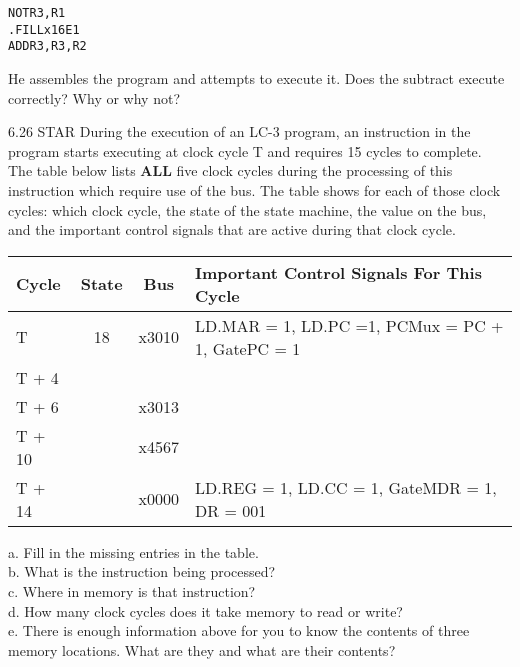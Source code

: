 \documentclass{patt}
\begin{document}
\begin{exercises}
\begin{center}
\begin{minipage}[t]{0.5\linewidth}
\begin{flushleft}
{
\begin{alltt}
NOT   R3,R1
.FILL x16E1
ADD   R3,R3,R2
\end{alltt}
}
\end{flushleft}
\end{minipage}
\end{center}

\noindent 
He assembles the program and attempts to execute it.
Does the subtract execute correctly?  Why or why not? \\

\item[6.26]STAR During the execution of an LC-3 program, an instruction in the program
starts executing at clock cycle T and requires 15 cycles to complete. \\

\noindent
The table below lists \textbf{ALL} five clock cycles during the
processing of this instruction which require use of the bus.  The table
shows for each of those clock cycles: which clock cycle, the state of the
state machine, the value on the bus, and the important control signals that
are active during that clock cycle. \\


\begin{center}
\begin{tabular}{|l|c|c|l|}
\hline
Cycle & State & Bus & Important Control Signals For This Cycle \\ \hline \hline
T &18 & x3010 & LD.MAR = 1, LD.PC =1, PCMux = PC + 1, GatePC = 1 { }{ }{ }{ }{ }{ }{ }{ }{ }{ }{ }{ }{ }{ }{ }{ }{ }{ }{ }{ }{ }{ }{ }{ }{ }\\ \hline
T + 4 &  &  &  \\ \hline
T + 6 &    & x3013 & \\ \hline
T + 10 &   & x4567 & \\ \hline
T + 14 &   & x0000 &  LD.REG = 1, LD.CC = 1, GateMDR = 1, DR =  001 \\ \hline

\end{tabular}
\end{center}

\noindent
a. Fill in the missing entries in the table. \\
b. What is the instruction being processed?\\
c. Where in memory is that instruction? \\
d. How many clock cycles does it take memory to read or write? \\
e. There is enough information above for you to know the contents of three
memory locations.  What are they and what are their contents?\\



\end{exercises}
\end{document}
